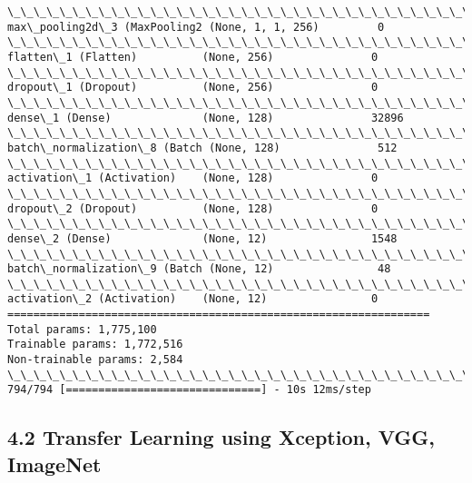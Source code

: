 \documentclass[11pt]{article}
\begin{document}
\begin{Verbatim}[commandchars=\\\{\}]
\_\_\_\_\_\_\_\_\_\_\_\_\_\_\_\_\_\_\_\_\_\_\_\_\_\_\_\_\_\_\_\_\_\_\_\_\_\_\_\_\_\_\_\_\_\_\_\_\_\_\_\_\_\_\_\_\_\_\_\_\_\_\_\_\_
max\_pooling2d\_3 (MaxPooling2 (None, 1, 1, 256)         0         
\_\_\_\_\_\_\_\_\_\_\_\_\_\_\_\_\_\_\_\_\_\_\_\_\_\_\_\_\_\_\_\_\_\_\_\_\_\_\_\_\_\_\_\_\_\_\_\_\_\_\_\_\_\_\_\_\_\_\_\_\_\_\_\_\_
flatten\_1 (Flatten)          (None, 256)               0         
\_\_\_\_\_\_\_\_\_\_\_\_\_\_\_\_\_\_\_\_\_\_\_\_\_\_\_\_\_\_\_\_\_\_\_\_\_\_\_\_\_\_\_\_\_\_\_\_\_\_\_\_\_\_\_\_\_\_\_\_\_\_\_\_\_
dropout\_1 (Dropout)          (None, 256)               0         
\_\_\_\_\_\_\_\_\_\_\_\_\_\_\_\_\_\_\_\_\_\_\_\_\_\_\_\_\_\_\_\_\_\_\_\_\_\_\_\_\_\_\_\_\_\_\_\_\_\_\_\_\_\_\_\_\_\_\_\_\_\_\_\_\_
dense\_1 (Dense)              (None, 128)               32896     
\_\_\_\_\_\_\_\_\_\_\_\_\_\_\_\_\_\_\_\_\_\_\_\_\_\_\_\_\_\_\_\_\_\_\_\_\_\_\_\_\_\_\_\_\_\_\_\_\_\_\_\_\_\_\_\_\_\_\_\_\_\_\_\_\_
batch\_normalization\_8 (Batch (None, 128)               512       
\_\_\_\_\_\_\_\_\_\_\_\_\_\_\_\_\_\_\_\_\_\_\_\_\_\_\_\_\_\_\_\_\_\_\_\_\_\_\_\_\_\_\_\_\_\_\_\_\_\_\_\_\_\_\_\_\_\_\_\_\_\_\_\_\_
activation\_1 (Activation)    (None, 128)               0         
\_\_\_\_\_\_\_\_\_\_\_\_\_\_\_\_\_\_\_\_\_\_\_\_\_\_\_\_\_\_\_\_\_\_\_\_\_\_\_\_\_\_\_\_\_\_\_\_\_\_\_\_\_\_\_\_\_\_\_\_\_\_\_\_\_
dropout\_2 (Dropout)          (None, 128)               0         
\_\_\_\_\_\_\_\_\_\_\_\_\_\_\_\_\_\_\_\_\_\_\_\_\_\_\_\_\_\_\_\_\_\_\_\_\_\_\_\_\_\_\_\_\_\_\_\_\_\_\_\_\_\_\_\_\_\_\_\_\_\_\_\_\_
dense\_2 (Dense)              (None, 12)                1548      
\_\_\_\_\_\_\_\_\_\_\_\_\_\_\_\_\_\_\_\_\_\_\_\_\_\_\_\_\_\_\_\_\_\_\_\_\_\_\_\_\_\_\_\_\_\_\_\_\_\_\_\_\_\_\_\_\_\_\_\_\_\_\_\_\_
batch\_normalization\_9 (Batch (None, 12)                48        
\_\_\_\_\_\_\_\_\_\_\_\_\_\_\_\_\_\_\_\_\_\_\_\_\_\_\_\_\_\_\_\_\_\_\_\_\_\_\_\_\_\_\_\_\_\_\_\_\_\_\_\_\_\_\_\_\_\_\_\_\_\_\_\_\_
activation\_2 (Activation)    (None, 12)                0         
=================================================================
Total params: 1,775,100
Trainable params: 1,772,516
Non-trainable params: 2,584
\_\_\_\_\_\_\_\_\_\_\_\_\_\_\_\_\_\_\_\_\_\_\_\_\_\_\_\_\_\_\_\_\_\_\_\_\_\_\_\_\_\_\_\_\_\_\_\_\_\_\_\_\_\_\_\_\_\_\_\_\_\_\_\_\_
794/794 [==============================] - 10s 12ms/step

    \end{Verbatim}

    \hypertarget{transfer-learning-using-xception-vgg-imagenet}{%
\subsection{4.2 Transfer Learning using Xception, VGG,
ImageNet}\label{transfer-learning-using-xception-vgg-imagenet}}
\end{document}
